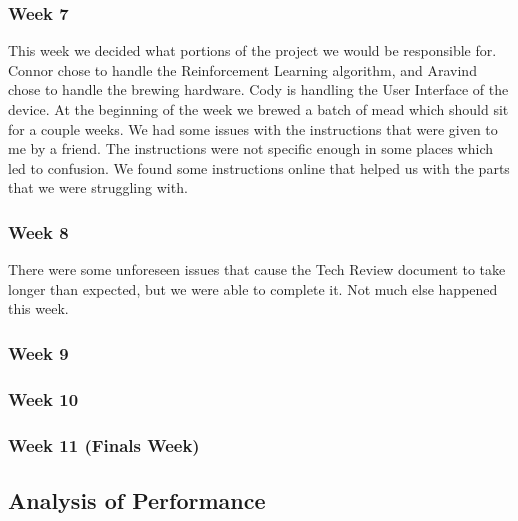 \documentclass[draftclsnofoot,onecolumn,letterpaper,10pt]{IEEEtran}
\begin{document}
\subsubsection{Week 7}
This week we decided what portions of the project we would be responsible for.
Connor chose to handle the Reinforcement Learning algorithm, and Aravind chose to handle the brewing hardware.
Cody is handling the User Interface of the device.
At the beginning of the week we brewed a batch of mead which should sit for a couple weeks.
We had some issues with the instructions that were given to me by a friend.
The instructions were not specific enough in some places which led to confusion.
We found some instructions online that helped us with the parts that we were struggling with.

\subsubsection{Week 8}
There were some unforeseen issues that cause the Tech Review document to take longer than expected, but we were able to complete it.
Not much else happened this week.

\subsubsection{Week 9}

\subsubsection{Week 10}

\subsubsection{Week 11 (Finals Week)}


\subsection{Analysis of Performance}\label{sec:analysis}
\end{document}
